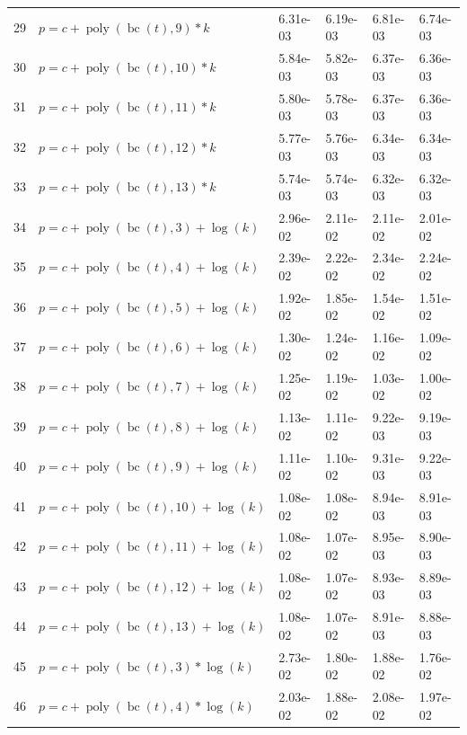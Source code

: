 \documentclass[12pt,a4paper]{article}
\DeclareMathOperator{\bc}{bc}
\DeclareMathOperator{\poly}{poly}
\begin{document}
\begin{longtable}[t]{ll>{\raggedleft\arraybackslash}p{2cm}>{\raggedleft\arraybackslash}p{2cm}>{\raggedleft\arraybackslash}p{2cm}>{\raggedleft\arraybackslash}p{2cm}}
\rowcolor{gray!6}  29 & $p = c + \poly\left( \bc(t), 9 \right) * k$ & 6.31e-03 & 6.19e-03 & 6.81e-03 & 6.74e-03\\
30 & $p = c + \poly\left( \bc(t), 10 \right) * k$ & 5.84e-03 & 5.82e-03 & 6.37e-03 & 6.36e-03\\
\rowcolor{gray!6}  31 & $p = c + \poly\left( \bc(t), 11 \right) * k$ & 5.80e-03 & 5.78e-03 & 6.37e-03 & 6.36e-03\\
32 & $p = c + \poly\left( \bc(t), 12 \right) * k$ & 5.77e-03 & 5.76e-03 & 6.34e-03 & 6.34e-03\\
\rowcolor{gray!6}  33 & $p = c + \poly\left( \bc(t), 13 \right) * k$ & 5.74e-03 & 5.74e-03 & 6.32e-03 & 6.32e-03\\
34 & $p = c + \poly\left( \bc(t), 3 \right) + \log(k)$ & 2.96e-02 & 2.11e-02 & 2.11e-02 & 2.01e-02\\
\rowcolor{gray!6}  35 & $p = c + \poly\left( \bc(t), 4 \right) + \log(k)$ & 2.39e-02 & 2.22e-02 & 2.34e-02 & 2.24e-02\\
36 & $p = c + \poly\left( \bc(t), 5 \right) + \log(k)$ & 1.92e-02 & 1.85e-02 & 1.54e-02 & 1.51e-02\\
\rowcolor{gray!6}  37 & $p = c + \poly\left( \bc(t), 6 \right) + \log(k)$ & 1.30e-02 & 1.24e-02 & 1.16e-02 & 1.09e-02\\
38 & $p = c + \poly\left( \bc(t), 7 \right) + \log(k)$ & 1.25e-02 & 1.19e-02 & 1.03e-02 & 1.00e-02\\
\rowcolor{gray!6}  39 & $p = c + \poly\left( \bc(t), 8 \right) + \log(k)$ & 1.13e-02 & 1.11e-02 & 9.22e-03 & 9.19e-03\\
40 & $p = c + \poly\left( \bc(t), 9 \right) + \log(k)$ & 1.11e-02 & 1.10e-02 & 9.31e-03 & 9.22e-03\\
\rowcolor{gray!6}  41 & $p = c + \poly\left( \bc(t), 10 \right) + \log(k)$ & 1.08e-02 & 1.08e-02 & 8.94e-03 & 8.91e-03\\
42 & $p = c + \poly\left( \bc(t), 11 \right) + \log(k)$ & 1.08e-02 & 1.07e-02 & 8.95e-03 & 8.90e-03\\
\rowcolor{gray!6}  43 & $p = c + \poly\left( \bc(t), 12 \right) + \log(k)$ & 1.08e-02 & 1.07e-02 & 8.93e-03 & 8.89e-03\\
44 & $p = c + \poly\left( \bc(t), 13 \right) + \log(k)$ & 1.08e-02 & 1.07e-02 & 8.91e-03 & 8.88e-03\\
\rowcolor{gray!6}  45 & $p = c + \poly\left( \bc(t), 3 \right) * \log(k)$ & 2.73e-02 & 1.80e-02 & 1.88e-02 & 1.76e-02\\
46 & $p = c + \poly\left( \bc(t), 4 \right) * \log(k)$ & 2.03e-02 & 1.88e-02 & 2.08e-02 & 1.97e-02\\

\end{longtable}
\end{document}

